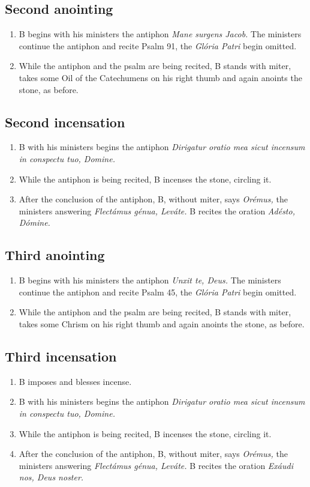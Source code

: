 \documentclass[twocolumn]{report}
\begin{document}
\subsection{Second anointing}
\begin{enumerate}
	\item B begins with his ministers the antiphon \textit{Mane surgens Jacob.} The ministers continue the antiphon and recite Psalm 91, the \textit{Glória Patri} begin omitted.
	\item While the antiphon and the psalm are being recited, B stands with miter, takes some Oil of the Catechumens on his right thumb and again anoints the stone, as before.
\end{enumerate}
\subsection{Second incensation}
\begin{enumerate}
	\item B with his ministers begins the antiphon \textit{Dirigatur oratio mea sicut incensum in conspectu tuo, Domine.}
	\item While the antiphon is being recited, B incenses the stone, circling it.
	\item After the conclusion of the antiphon, B, without miter, says \textit{Orémus,} the ministers answering \textit{Flectámus génua, Leváte.} B recites the oration \textit{Adésto, Dómine.}
\end{enumerate}
\subsection{Third anointing}
\begin{enumerate}
	\item B begins with his ministers the antiphon \textit{Unxit te, Deus.} The ministers continue the antiphon and recite Psalm 45, the \textit{Glória Patri} begin omitted.
	\item While the antiphon and the psalm are being recited, B stands with miter, takes some Chrism on his right thumb and again anoints the stone, as before.
\end{enumerate}
\subsection{Third incensation}
\begin{enumerate}
	\item B imposes and blesses incense.
	\item B with his ministers begins the antiphon \textit{Dirigatur oratio mea sicut incensum in conspectu tuo, Domine.}
	\item While the antiphon is being recited, B incenses the stone, circling it.
	\item After the conclusion of the antiphon, B, without miter, says \textit{Orémus,} the ministers answering \textit{Flectámus génua, Leváte.} B recites the oration \textit{Exáudi nos, Deus noster.}
\end{enumerate}
\end{document}
